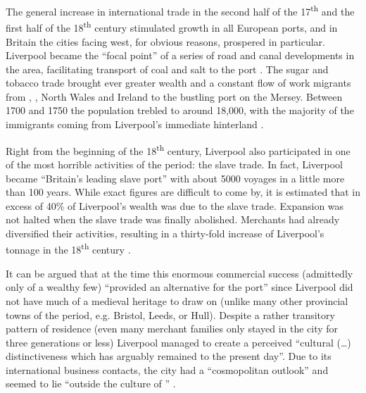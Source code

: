 The general increase in international trade in the second half of the 17\textsuperscript{th} and the first half of the 18\textsuperscript{th} century stimulated growth in all European ports, and in Britain the cities facing west, for obvious reasons, prospered in particular.
Liverpool became the ``focal point'' of a series of road and canal developments in the area, facilitating transport of  coal and  salt to the port \citep[129]{longmore2006}.
The sugar and tobacco trade brought ever greater wealth and a constant flow of work migrants from , , North Wales and Ireland to the bustling port on the Mersey.
Between 1700 and 1750 the population trebled to around 18,000, with the majority of the immigrants coming from Liverpool's immediate hinterland \citep[cf.][114--119 and 169]{longmore2006}.

Right from the beginning of the 18\textsuperscript{th} century, Liverpool also participated in one of the most horrible activities of the period: the slave trade.
In fact, Liverpool became ``Britain's leading slave port'' with about 5000 voyages in a little more than 100 years.
While exact figures are difficult to come by, it is estimated that in excess of 40\% of Liverpool's wealth was due to the slave trade.
Expansion was not halted when the slave trade was finally abolished.
Merchants had already diversified their activities, resulting in a thirty-fold increase of Liverpool's tonnage in the 18\textsuperscript{th} century \citep[cf.][131--134 and 137]{longmore2006}.

\largerpage
It can be argued that at the time this enormous commercial success (admittedly only of a wealthy few) ``provided an alternative  for the port'' since Liverpool did not have much of a medieval heritage to draw on (unlike many other provincial towns of the period, e.g. Bristol, Leeds, or Hull).
Despite a rather transitory pattern of residence (even many merchant families only stayed in the city for three generations or less) Liverpool managed to create a perceived ``cultural (\ldots) distinctiveness which has arguably remained to the present day''. Due to its international business contacts, the city had a ``cosmopolitan outlook'' and seemed to lie ``outside the culture of '' \citep[152--154]{longmore2006}.

